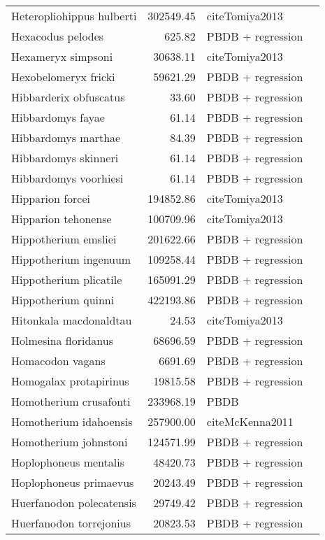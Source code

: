 \begin{table}[ht]
\begin{tabular}{lrll}
  Heteropliohippus hulberti & 302549.45 & cite{Tomiya2013} &  \\ 
  Hexacodus pelodes & 625.82 & PBDB + regression &  \\ 
  Hexameryx simpsoni & 30638.11 & cite{Tomiya2013} &  \\ 
  Hexobelomeryx fricki & 59621.29 & PBDB + regression &  \\ 
  Hibbarderix obfuscatus & 33.60 & PBDB + regression &  \\ 
  Hibbardomys fayae & 61.14 & PBDB + regression &  \\ 
  Hibbardomys marthae & 84.39 & PBDB + regression &  \\ 
  Hibbardomys skinneri & 61.14 & PBDB + regression &  \\ 
  Hibbardomys voorhiesi & 61.14 & PBDB + regression &  \\ 
  Hipparion forcei & 194852.86 & cite{Tomiya2013} &  \\ 
  Hipparion tehonense & 100709.96 & cite{Tomiya2013} &  \\ 
  Hippotherium emsliei & 201622.66 & PBDB + regression &  \\ 
  Hippotherium ingenuum & 109258.44 & PBDB + regression &  \\ 
  Hippotherium plicatile & 165091.29 & PBDB + regression &  \\ 
  Hippotherium quinni & 422193.86 & PBDB + regression &  \\ 
  Hitonkala macdonaldtau & 24.53 & cite{Tomiya2013} &  \\ 
  Holmesina floridanus & 68696.59 & PBDB + regression &  \\ 
  Homacodon vagans & 6691.69 & PBDB + regression &  \\ 
  Homogalax protapirinus & 19815.58 & PBDB + regression &  \\ 
  Homotherium crusafonti & 233968.19 & PBDB &  \\ 
  Homotherium idahoensis & 257900.00 & cite{McKenna2011} &  \\ 
  Homotherium johnstoni & 124571.99 & PBDB + regression &  \\ 
  Hoplophoneus mentalis & 48420.73 & PBDB + regression &  \\ 
  Hoplophoneus primaevus & 20243.49 & PBDB + regression &  \\ 
  Huerfanodon polecatensis & 29749.42 & PBDB + regression &  \\ 
  Huerfanodon torrejonius & 20823.53 & PBDB + regression &  \\ 

\end{tabular}
\end{table}
